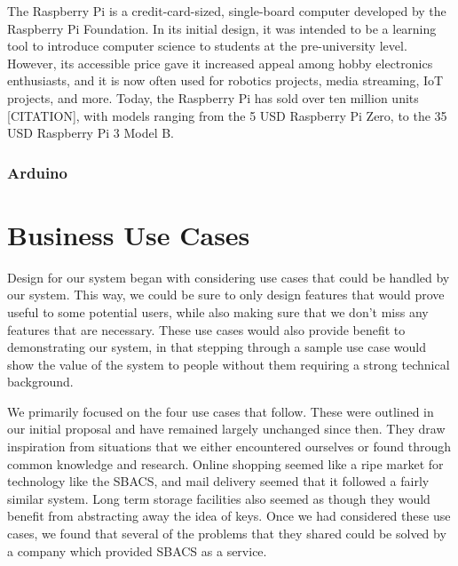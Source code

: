 \documentclass[12pt]{report}
\begin{document}
The Raspberry Pi is a credit-card-sized, single-board computer developed by the Raspberry Pi Foundation. In its initial 
design, it was intended to be a learning tool to introduce computer science to students at the pre-university  
level. However, its accessible price gave it increased appeal among hobby electronics enthusiasts, and it is now often 
used for robotics projects, media streaming, IoT projects, and more. Today, the Raspberry Pi has sold over ten million 
units [CITATION], with models ranging from the 5 USD Raspberry Pi Zero, to the 35 USD Raspberry Pi 3 Model B.


\subsection{Arduino}


\chapter{Business Use Cases}

Design for our system began with considering use cases that could be handled by our system. This way, we could be sure
to only design features that would prove useful to some potential users, while also making sure that we don't miss any
features that are necessary. These use cases would also provide benefit to demonstrating our system, in that stepping
through a sample use case would show the value of the system to people without them requiring a strong technical
background.

We primarily focused on the four use cases that follow. These were outlined in our initial proposal and have remained
largely unchanged since then. They draw inspiration from situations that we either encountered ourselves or found
through common knowledge and research. Online shopping seemed like a ripe market for technology like the SBACS, and
mail delivery seemed that it followed a fairly similar system. Long term storage facilities also seemed as though they
would benefit from abstracting away the idea of keys. Once we had considered these use cases, we found that several of
the problems that they shared could be solved by a company which provided SBACS as a service.

\end{document}
